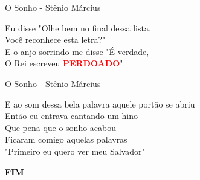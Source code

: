 \documentclass[compress]{beamer}
\begin{document}
\begin{frame}{O Sonho - Stênio Március}

\huge Eu disse "Olhe bem no final dessa lista, \\
Você reconhece esta letra?" \\
E o anjo sorrindo me disse "É verdade, \\
O Rei escreveu \textbf{\textcolor{red}{PERDOADO}}"
\end{frame}

\begin{frame}{O Sonho - Stênio Március}

\huge E ao som dessa bela palavra aquele portão se abriu \\
Então eu entrava cantando um hino \\
Que pena que o sonho acabou \\
Ficaram comigo aquelas palavras \\
"Primeiro eu quero ver meu Salvador"
\end{frame}

\begin{frame}
\centering
\Huge \textbf{\textcolor{black}{FIM}}
\end{frame}
\end{document}
